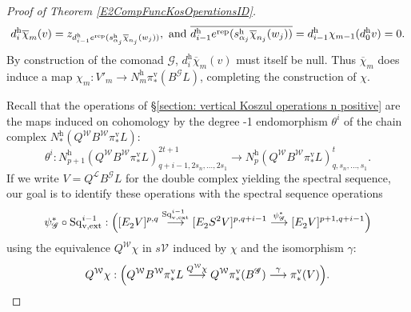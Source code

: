 \documentclass[11pt]{amsart} \renewcommand{\baselinestretch}{1.2}
\theoremstyle{plain}
\numberwithin{equation}{section} %
\theoremstyle{plain}
\numberwithin{equation}{chapter} %
\renewcommand{\to}{\longrightarrow}
\newcommand{\scrG}{\mathscr{G}}
\newcommand{\calL}{\mathcal{L}}
\newcommand{\calV}{\mathcal{V}}
\newcommand{\calw}{\mathcal{W}}
\newcommand{\vect}[2]{\calV^{#1}_{#2}}
\newcommand{\BSW}{{\scrG}}
\newcommand{\BSWres}{B^\BSW}%
\newcommand{\vExtCohOp}{\mathrm{Sq}_\mathrm{v,ext}}
\newcommand{\Edownup}[5]{[E_{#1}^{#2}#3]^{#4}_{#5}}
\newcommand{\uver}{^\mathrm{v}}
\newcommand{\uhor}{^\mathrm{h}}
\begin{document}
\begin{Operations in composite functor spectral sequences}
\begin{proof}[Proof of Theorem \ref{E2CompFuncKosOperationsID}]
\[d\uhor_i\overline{\chi}_m(v) =z_{d\uhor_{i-1}e^\textup{rep}(s\uhor_{\alpha_j}\overline{\chi}_{n_j}(w_j))}, \textup{ and }\overline{d\uhor_{i-1}e^\textup{rep}(s\uhor_{\alpha_j}\overline{\chi}_{n_j}(w_j))}=d\uhor_{i-1}\chi_{m-1}(d\uhor_0v)=0.\]
By construction of the comonad $\BSW$, $d\uhor_i\overline{\chi}_m(v)$ must itself be null. 
Thus $\overline{\chi}_m$ does induce a map $\chi_m:V'_m\to N\uhor_m\pi\uver_*(\BSWres L)$, completing the construction of $\chi$.

Recall that the operations of \S\ref{section: vertical Koszul operations n positive} are the maps induced on cohomology by the degree -1 endomorphism $\theta^i$ of the chain complex $N\uhor_*(Q^{\calw} B^{\calw}\pi\uver_*L)$:
\[\theta^i:N\uhor_{p+1}(Q^{\calw} B^{\calw}\pi\uver_*L)^{2t+1}_{q+i-1,2s_n,\ldots,2s_1}\to N\uhor_{p}(Q^{\calw} B^{\calw}\pi\uver_*L)^{t}_{q,s_n,\ldots,s_1}.\]
If we write $V=Q^{\calL}\BSWres L$ for the double complex yielding the spectral sequence, our goal is to identify these operations with the spectral sequence operations
\[\psi_\BSW^*\circ\vExtCohOp^{i-1}:\Bigl(\Edownup{2}{}{V}{p,q}{}\overset{\vExtCohOp^{i-1}}{\to} \Edownup{2}{}{S^2V}{p,q+i-1}{}\overset{\psi_\BSW^*}{\to}\Edownup{2}{}{V}{p+1,q+i-1}{}\Bigr)\]
using the equivalence $Q^{\calw}\chi$ in $s\vect{}{}$ induced by $\chi$ and the isomorphism $\gamma$:%
\[Q^{\calw}\chi:\Bigl(Q^{\calw}B^{\calw} \pi\uver_*L\overset{Q^{\calw}\chi}{\to} Q^{\calw}\pi\uver_*(\BSWres )\overset{\gamma}{\to}\pi\uver_*(V)\Bigr).\]


\end{proof}
\end{Operations in composite functor spectral sequences}
\end{document}
